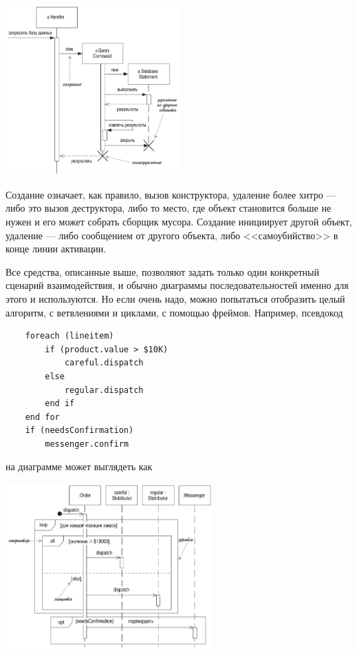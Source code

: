 \documentclass{../mcstext}
\begin{document}
\begin{center}
    \includegraphics[width=0.5\textwidth]{sequenceDiagramCreationAndDeletion.png}
\end{center}

Создание означает, как правило, вызов конструктора, удаление более хитро --- либо это вызов деструктора, либо то место, где объект становится больше не нужен и его может собрать сборщик мусора. Создание инициирует другой объект, удаление --- либо сообщением от другого объекта, либо <<самоубийство>> в конце линии активации.

Все средства, описанные выше, позволяют задать только один конкретный сценарий взаимодействия, и обычно диаграммы последовательностей именно для этого и используются. Но если очень надо, можно попытаться отобразить целый алгоритм, с ветвлениями и циклами, с помощью фреймов. Например, псевдокод

\begin{verbatim}
    foreach (lineitem)
        if (product.value > $10K)
            careful.dispatch
        else
            regular.dispatch
        end if
    end for
    if (needsConfirmation) 
        messenger.confirm
\end{verbatim}

на диаграмме может выглядеть как

\begin{center}
    \includegraphics[width=0.6\textwidth]{sequenceDiagramFrames.png}
\end{center}
\end{document}
